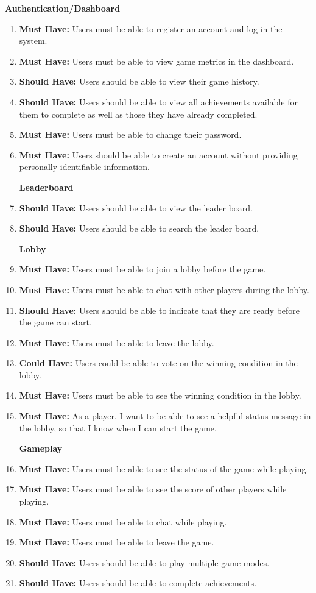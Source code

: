 \documentclass{l4proj}
\begin{document}
\textbf{Authentication/Dashboard}
\begin{enumerate}
    \item \textbf{Must Have:} Users must be able to register an account and log in the system.
    \item \textbf{Must Have:} Users must be able to view game metrics in the dashboard.
    \item \textbf{Should Have:} Users should be able to view their game history.
    \item \textbf{Should Have:} Users should be able to view all achievements available for them to complete as well as those they have already completed.
    \item \textbf{Must Have:} Users must be able to change their password.
    \item \textbf{Must Have:} Users should be able to create an account without providing personally identifiable information.


\textbf{Leaderboard}
    \item \textbf{Should Have:} Users should be able to view the leader board.
    \item \textbf{Should Have:} Users should be able to search the leader board.


\textbf{Lobby}
    \item \textbf{Must Have:} Users must be able to join a lobby before the game.
    \item \textbf{Must Have:} Users must be able to chat with other players during the lobby.
    \item \textbf{Should Have:} Users should be able to indicate that they are ready before the game can start.
    \item \textbf{Must Have:} Users must be able to leave the lobby.
    \item \textbf{Could Have:} Users could be able to vote on the winning condition in the lobby.
    \item \textbf{Must Have:} Users must be able to see the winning condition in the lobby.
    \item \textbf{Must Have:} As a player, I want to be able to see a helpful status message in the lobby, so that I know when I can start the game.


\textbf{Gameplay}
    \item \textbf{Must Have:} Users must be able to see the status of the game while playing.
    \item \textbf{Must Have:} Users must be able to see the score of other players while playing.
    \item \textbf{Must Have:} Users must be able to chat while playing.
    \item \textbf{Must Have:} Users must be able to leave the game.
    \item \textbf{Should Have:} Users should be able to play multiple game modes.
    \item \textbf{Should Have:} Users should be able to complete achievements.


\end{enumerate}
\end{document}
